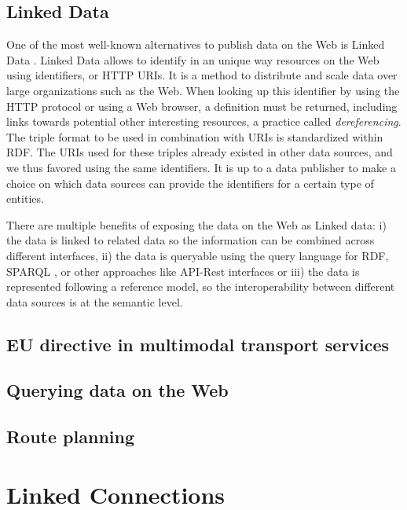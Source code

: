 \documentclass[sw]{iosart2x}
\begin{document}
\subsection{Linked Data}
One of the most well-known alternatives to publish data on the Web is Linked Data \cite{bizer2009linked}. Linked Data allows to identify in an unique way resources on the Web using identifiers, or HTTP URIs. It is a method to distribute and scale data over large organizations such as the Web. When looking up this identifier by using the HTTP protocol or using a Web browser, a definition must be returned, including links towards potential other interesting resources, a practice called \textit{dereferencing}. The triple format to be used in combination with URIs is standardized within RDF. The URIs used for these triples already existed in other data sources, and we thus favored using the same identifiers. It is up to a data publisher to make a choice on which data sources can provide the identifiers for a certain type of entities. 

There are multiple benefits of exposing the data on the Web as Linked data: i) the data is linked to related data so the information can be combined across different interfaces, ii) the data is queryable using the query language for RDF, SPARQL \cite{prud2006sparql}, or other approaches like API-Rest interfaces \cite{world2014json} or \cite{lanthaler2013creating} iii) the data is represented following a reference model, so the interoperability between different data sources is at the semantic level.

\subsection{EU directive in multimodal transport services}

\subsection{Querying data on the Web}

\subsection{Route planning}



\section{Linked Connections}
\end{document}
